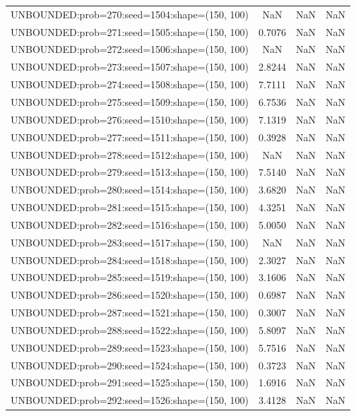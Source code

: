 \begin{longtable}{lccc}
UNBOUNDED:prob=270:seed=1504:shape=(150, 100) &     NaN &   NaN &    NaN \\
UNBOUNDED:prob=271:seed=1505:shape=(150, 100) &  0.7076 &   NaN &    NaN \\
UNBOUNDED:prob=272:seed=1506:shape=(150, 100) &     NaN &   NaN &    NaN \\
UNBOUNDED:prob=273:seed=1507:shape=(150, 100) &  2.8244 &   NaN &    NaN \\
UNBOUNDED:prob=274:seed=1508:shape=(150, 100) &  7.7111 &   NaN &    NaN \\
UNBOUNDED:prob=275:seed=1509:shape=(150, 100) &  6.7536 &   NaN &    NaN \\
UNBOUNDED:prob=276:seed=1510:shape=(150, 100) &  7.1319 &   NaN &    NaN \\
UNBOUNDED:prob=277:seed=1511:shape=(150, 100) &  0.3928 &   NaN &    NaN \\
UNBOUNDED:prob=278:seed=1512:shape=(150, 100) &     NaN &   NaN &    NaN \\
UNBOUNDED:prob=279:seed=1513:shape=(150, 100) &  7.5140 &   NaN &    NaN \\
UNBOUNDED:prob=280:seed=1514:shape=(150, 100) &  3.6820 &   NaN &    NaN \\
UNBOUNDED:prob=281:seed=1515:shape=(150, 100) &  4.3251 &   NaN &    NaN \\
UNBOUNDED:prob=282:seed=1516:shape=(150, 100) &  5.0050 &   NaN &    NaN \\
UNBOUNDED:prob=283:seed=1517:shape=(150, 100) &     NaN &   NaN &    NaN \\
UNBOUNDED:prob=284:seed=1518:shape=(150, 100) &  2.3027 &   NaN &    NaN \\
UNBOUNDED:prob=285:seed=1519:shape=(150, 100) &  3.1606 &   NaN &    NaN \\
UNBOUNDED:prob=286:seed=1520:shape=(150, 100) &  0.6987 &   NaN &    NaN \\
UNBOUNDED:prob=287:seed=1521:shape=(150, 100) &  0.3007 &   NaN &    NaN \\
UNBOUNDED:prob=288:seed=1522:shape=(150, 100) &  5.8097 &   NaN &    NaN \\
UNBOUNDED:prob=289:seed=1523:shape=(150, 100) &  5.7516 &   NaN &    NaN \\
UNBOUNDED:prob=290:seed=1524:shape=(150, 100) &  0.3723 &   NaN &    NaN \\
UNBOUNDED:prob=291:seed=1525:shape=(150, 100) &  1.6916 &   NaN &    NaN \\
UNBOUNDED:prob=292:seed=1526:shape=(150, 100) &  3.4128 &   NaN &    NaN \\

\end{longtable}
